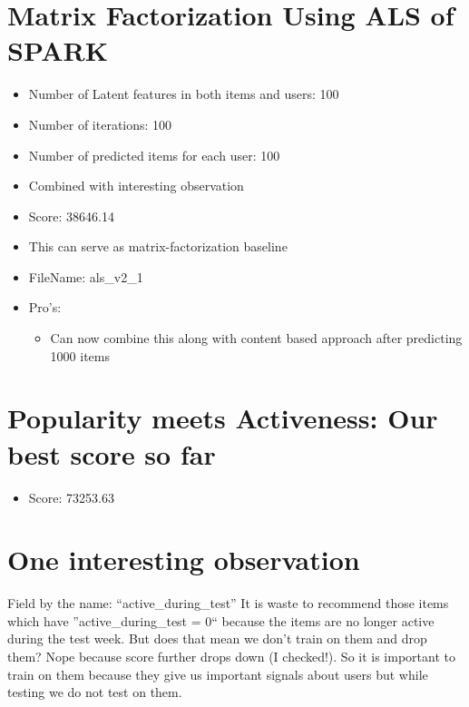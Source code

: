 \documentclass{article}
\begin{document}
\section{Matrix Factorization Using ALS of SPARK}

\begin{itemize}
 \item Number of Latent features in both items and users: 100
 \item Number of iterations: 100
 \item Number of predicted items for each user: 100
 \item Combined with interesting observation
 \item Score:  38646.14
 \item This can serve as matrix-factorization baseline
 \item FileName: als\_v2\_1
 \item Pro's:
 \begin{itemize}
 \item Can now combine this along with content based approach after predicting 1000 items
 \end{itemize}
 
\end{itemize}

\section{Popularity meets Activeness: Our best score so far}
\begin{itemize}
 \item Score: 73253.63
 \end{itemize}



\section{One interesting observation}
Field by the name: ``active\_during\_test''
It is waste to recommend those items which have ''active\_during\_test = 0`` because the items are no longer active during the test week. But does that mean we don't train on them and drop 
them? Nope because score further drops down (I checked!). So it is important to train on them because they give us important signals about users but while testing we do not test on them.
\end{document}
